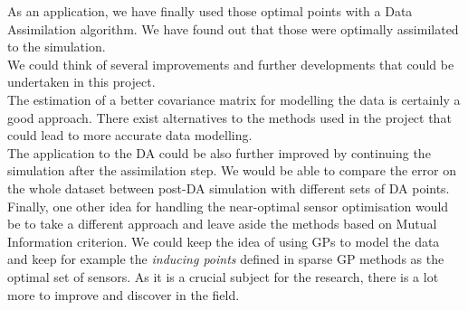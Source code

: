 As an application, we have finally used those optimal points with a Data Assimilation algorithm. We have found out that those were optimally assimilated to the simulation.  \\


We could think of several improvements and further developments that could be undertaken in this project. \\

The estimation of a better covariance matrix for modelling the data is certainly a good approach. There exist alternatives to the methods used in the project that could lead to more accurate data modelling. \\

The application to the DA could be also further improved by continuing the simulation after the assimilation step. We would be able to compare the error on the whole dataset between post-DA simulation with different sets of DA points. \\

Finally, one other idea for handling the near-optimal sensor optimisation would be to take a different approach and leave aside the methods based on Mutual Information criterion. We could keep the idea of using GPs to model the data and keep for example the \textit{inducing points} defined in sparse GP methods as the optimal set of sensors. As it is a crucial subject for the research, there is a lot more to improve and discover in the field. \\







